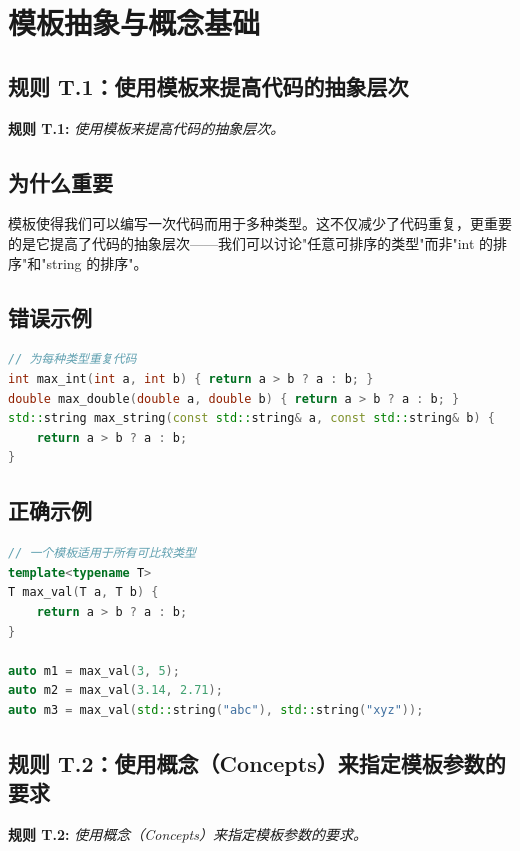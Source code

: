 \section{模板抽象与概念基础}

\subsection{规则 T.1：使用模板来提高代码的抽象层次}

\textbf{规则 T.1:} \textit{使用模板来提高代码的抽象层次。}

\subsection{为什么重要}

模板使得我们可以编写一次代码而用于多种类型。这不仅减少了代码重复，更重要的是它提高了代码的抽象层次——我们可以讨论"任意可排序的类型"而非"int 的排序"和"string 的排序"。

\subsection{错误示例}

\begin{lstlisting}[language=C++]
// 为每种类型重复代码
int max_int(int a, int b) { return a > b ? a : b; }
double max_double(double a, double b) { return a > b ? a : b; }
std::string max_string(const std::string& a, const std::string& b) {
    return a > b ? a : b;
}
\end{lstlisting}

\subsection{正确示例}

\begin{lstlisting}[language=C++]
// 一个模板适用于所有可比较类型
template<typename T>
T max_val(T a, T b) {
    return a > b ? a : b;
}

auto m1 = max_val(3, 5);
auto m2 = max_val(3.14, 2.71);
auto m3 = max_val(std::string("abc"), std::string("xyz"));
\end{lstlisting}

\subsection{规则 T.2：使用概念（Concepts）来指定模板参数的要求}

\textbf{规则 T.2:} \textit{使用概念（Concepts）来指定模板参数的要求。}

